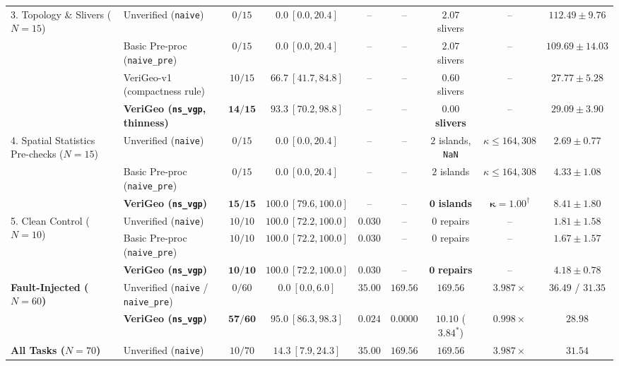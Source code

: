\documentclass[10pt,twocolumn]{article}
\begin{document}
\begin{table}[t]
{\begin{tabular}{llccccccc}
\midrule
\multirow{4}{*}{3. Topology \& Slivers ($N=15$)}
  & Unverified (\texttt{naive}) & $0/15$ & $0.0\ [0.0, 20.4]$ & -- & -- & $2.07$ slivers & -- & $112.49 \pm 9.76$ \\
  & Basic Pre-proc (\texttt{naive\_pre}) & $0/15$ & $0.0\ [0.0, 20.4]$ & -- & -- & $2.07$ slivers & -- & $109.69 \pm 14.03$ \\
  & VeriGeo-v1 (compactness rule) & $10/15$ & $66.7\ [41.7, 84.8]$ & -- & -- & $0.60$ slivers & -- & $27.77 \pm 5.28$ \\
  & \textbf{VeriGeo (\texttt{ns\_vgp}, thinness)} & $\mathbf{14/15}$ & $\mathbf{93.3\ [70.2, 98.8]}$ & -- & -- & $\mathbf{0.00}$ \textbf{slivers} & -- & $29.09 \pm 3.90$ \\
\midrule
\multirow{3}{*}{4. Spatial Statistics Pre-checks ($N=15$)}
  & Unverified (\texttt{naive}) & $0/15$ & $0.0\ [0.0, 20.4]$ & -- & -- & $2$ islands, \texttt{NaN} & $\kappa \le 164,308$ & $2.69 \pm 0.77$ \\
  & Basic Pre-proc (\texttt{naive\_pre}) & $0/15$ & $0.0\ [0.0, 20.4]$ & -- & -- & $2$ islands & $\kappa \le 164,308$ & $4.33 \pm 1.08$ \\
  & \textbf{VeriGeo (\texttt{ns\_vgp})} & $\mathbf{15/15}$ & $\mathbf{100.0\ [79.6, 100.0]}$ & -- & -- & $\mathbf{0}$ \textbf{islands} & $\mathbf{\kappa = 1.00^\dagger}$ & $8.41 \pm 1.80$ \\
\midrule
\multirow{3}{*}{5. Clean Control ($N=10$)}
  & Unverified (\texttt{naive}) & $10/10$ & $100.0\ [72.2, 100.0]$ & $0.030$ & -- & $0$ repairs & -- & $1.81 \pm 1.58$ \\
  & Basic Pre-proc (\texttt{naive\_pre}) & $10/10$ & $100.0\ [72.2, 100.0]$ & $0.030$ & -- & $0$ repairs & -- & $1.67 \pm 1.57$ \\
  & \textbf{VeriGeo (\texttt{ns\_vgp})} & $\mathbf{10/10}$ & $\mathbf{100.0\ [72.2, 100.0]}$ & $\mathbf{0.030}$ & -- & $\mathbf{0}$ \textbf{repairs} & -- & $4.18 \pm 0.78$ \\
\midrule
\multirow{2}{*}{\textbf{Fault-Injected ($N=60$)}}
  & Unverified (\texttt{naive} / \texttt{naive\_pre}) & $0/60$ & $0.0\ [0.0, 6.0]$ & $35.00$ & $169.56$ & $169.56$ & $3.987\times$ & $36.49$ / $31.35$ \\
  & \textbf{VeriGeo (\texttt{ns\_vgp})} & $\mathbf{57/60}$ & $\mathbf{95.0\ [86.3, 98.3]}$ & $\mathbf{0.024}$ & $\mathbf{0.0000}$ & $\mathbf{10.10}$ ($\mathbf{3.84^*}$) & $\mathbf{0.998\times}$ & $\mathbf{28.98}$ \\
\midrule
\multirow{3}{*}{\textbf{All Tasks ($N=70$)}}
  & Unverified (\texttt{naive}) & $10/70$ & $14.3\ [7.9, 24.3]$ & $35.00$ & $169.56$ & $169.56$ & $3.987\times$ & $31.54$ \\

\end{tabular}}
\end{table}
\end{document}
